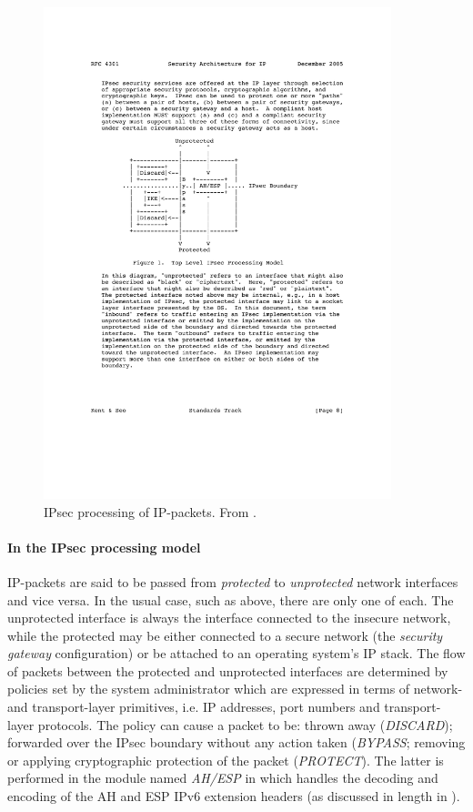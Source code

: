 \documentclass[final,a4paper,twoside,11pt,onecolumn]{report}
\begin{document}
\begin{figure}[h!]
   \includegraphics[width=0.9\textwidth]{ipsec-flow}
   \caption{IPsec processing of IP-packets. From \citep[p.8]{rfc4301}.}
   \label{fig:ipsec-flow}
\end{figure}

\paragraph{In the IPsec processing model} \label{ipsec_proc}
IP-packets are said to be passed from \emph{protected} to \emph{unprotected} network interfaces and vice versa. In the usual case, such as above, there are only one of each. The unprotected interface is always the interface connected to the insecure network, while the protected may be either connected to a secure network (the \emph{security gateway} configuration) or be attached to an operating system's IP stack. The flow of packets between the protected and unprotected interfaces are determined by policies set by the system administrator which are expressed in terms of network- and transport-layer primitives, i.e. IP addresses, port numbers and transport-layer protocols. The policy can cause a packet to be: thrown away (\emph{DISCARD}); forwarded over the IPsec boundary without any action taken (\emph{BYPASS}; removing or applying cryptographic protection of the packet (\emph{PROTECT}). The latter is performed in the module named \emph{AH/ESP} in  which handles the decoding and encoding of the AH and ESP IPv6 extension headers (as discussed in length in ).
   
\end{document}
